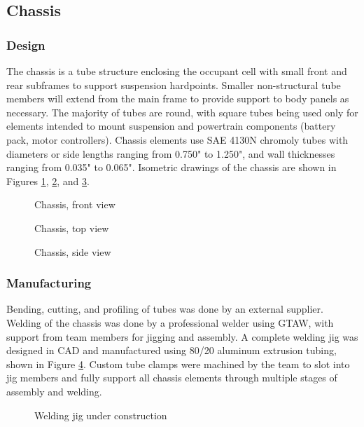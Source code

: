 \documentclass[10pt]{article}
\begin{document}
\subsection{Chassis}
\subsubsection{Design}
The chassis is a tube structure enclosing the occupant cell with small front and rear subframes to support suspension hardpoints. Smaller non-structural tube members will extend from the main frame to provide support to body panels as necessary. The majority of tubes are round, with square tubes being used only for elements intended to mount suspension and powertrain components (battery pack, motor controllers). Chassis elements use SAE 4130N chromoly tubes with diameters or side lengths ranging from 0.750" to 1.250", and wall thicknesses ranging from 0.035" to 0.065". Isometric drawings of the chassis are shown in Figures \ref{fig:chassis-front}, \ref{fig:chassis-top}, and \ref{fig:chassis-side}.

\begin{figure}
\centering
\caption{Chassis, front view}
\label{fig:chassis-front}
\end{figure}
\begin{figure}
\centering
\caption{Chassis, top view}
\label{fig:chassis-top}
\end{figure}
\begin{figure}
\centering
\caption{Chassis, side view}
\label{fig:chassis-side}
\end{figure}

\subsubsection{Manufacturing}
Bending, cutting, and profiling of tubes was done by an external supplier. Welding of the chassis was done by a professional welder using GTAW, with support from team members for jigging and assembly. A complete welding jig was designed in CAD and manufactured using 80/20 aluminum extrusion tubing, shown in Figure \ref{fig:welding-jig}. Custom tube clamps were machined by the team to slot into jig members and fully support all chassis elements through multiple stages of assembly and welding.

\begin{figure}
\centering
\caption{Welding jig under construction}
\label{fig:welding-jig}
\end{figure}
\end{document}

